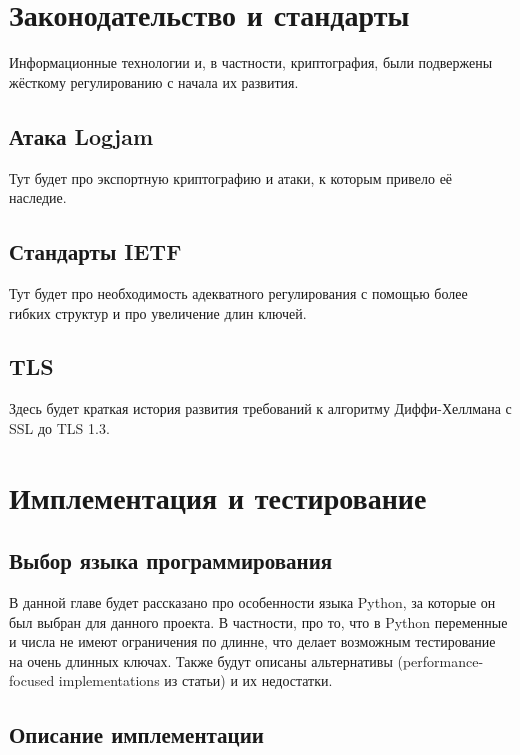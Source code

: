 \documentclass[times,specification,annotation]{itmo-student-thesis}
\begin{document}
\chapter{Законодательство и стандарты}

Информационные технологии и, в частности, криптография, были подвержены жёсткому регулированию с начала их развития.

\section{Атака Logjam}\label{sec:logjam}

Тут будет про экспортную криптографию и атаки, к которым привело её наследие.

\section{Стандарты IETF}\label{sec:IETF}

Тут будет про необходимость адекватного регулирования с помощью более гибких структур и про увеличение длин ключей.

\section{TLS}\label{sec:TLS}

Здесь будет краткая история развития требований к алгоритму Диффи-Хеллмана с SSL до TLS 1.3.

\chapter{Имплементация и тестирование}

\section{Выбор языка программирования}\label{sec:prog}

В данной главе будет рассказано про особенности языка Python, за которые он был выбран для данного проекта.
В частности, про то, что в Python переменные и числа не имеют ограничения по длинне, что делает
возможным тестирование на очень длинных ключах.
Также будут описаны альтернативы (performance-focused implementations из статьи) и их недостатки.

\section{Описание имплементации}\label{sec:impl}
\end{document}
